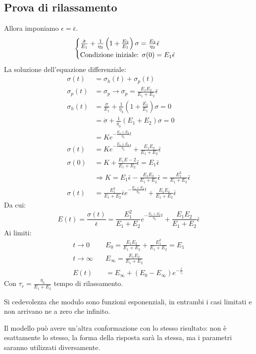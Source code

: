 \subsection{Prova di rilassamento}
Allora imponiamo $\epsilon = \bar{\epsilon}$.
\begin{equation}
\begin{cases}
\frac{\dot{\sigma}}{E_1} + \frac{1}{\eta_3}\left(1 + \frac{E_2}{E_1}\right)\sigma = \frac{E_2}{\eta_3}\bar{\epsilon}\\
\textup{Condizione iniziale: } \sigma(0) = E_1\bar{\epsilon}\\
\end{cases}
\end{equation}
La soluzione dell'equazione differenziale:
\begin{equation}
\begin{split}
\sigma(t) &= \sigma_h(t) + \sigma_p(t)\\
\sigma_p(t) &= \sigma_p \rightarrow \sigma_p = \frac{E_1 E_2}{E_1+E_2}\bar{\epsilon}\\
\sigma_h(t) &= \frac{\dot{\sigma}}{E_1} + \frac{1}{\eta_3}\left(1+\frac{E_2}{E_1}\right)\sigma = 0\\
&= \dot{\sigma} + \frac{1}{\eta_3}\left(E_1 + E_2\right)\sigma = 0\\
&= K e^{-\frac{E_1+E_2}{\eta_3}t}\\
\sigma(t) &= Ke^{-\frac{E_1+E_2}{\eta_3}t} + \frac{E_1E_2}{E_1+E_2}\bar{\epsilon}\\
\sigma(0) &= K + \frac{E_1E-2}{E_1 + E_2}\bar{\epsilon} = E_1\bar{\epsilon}\\
&\Rightarrow K = E_1\bar{\epsilon}-\frac{E_1E_2}{E_1+E_2}\bar{\epsilon} = \frac{E_1^2}{E_1+E_2}\bar{\epsilon}\\
\sigma(t) &= \frac{E_1^2}{E_1+E_2}\bar{\epsilon}e^{-\frac{E_1+E_2}{\eta_3}t}+\frac{E_1E_2}{E_1+E_2}\bar{\epsilon}
\end{split}
\end{equation}
Da cui:
\begin{equation}
E(t) = \frac{\sigma(t)}{\bar{\epsilon}} = \frac{E_1^2}{E_1+E_2}e^{-\frac{E_1+E_2}{\eta_3}t}+\frac{E_1E_2}{E_1+E_2}\bar{\epsilon}
\end{equation}
Ai limiti:
\begin{equation}
\begin{split}
t \rightarrow 0 \quad &E_0 = \frac{E_1E_2}{E_1+E_2}+\frac{E_1^2}{E_1+E_2} = E_1\\
t \rightarrow \infty \quad &E_{\infty} = \frac{E_1E_2}{E_1+E_2}\\
E(t) &= E_{\infty} + (E_0 - E_{\infty})e^{-\frac{t}{\tau_r}}
\end{split}
\end{equation}
Con $\tau_r = \frac{\eta_3}{E_1+E_2}$ tempo di rilassamento.

Si cedevolezza che modulo sono funzioni esponenziali, in entrambi i casi limitati e non arrivano ne a zero che infinito.

Il modello  può avere un'altra conformazione con lo stesso risultato: non è esattamente lo stesso, la forma della risposta sarà la stessa, ma i parametri saranno utilizzati diversamente.